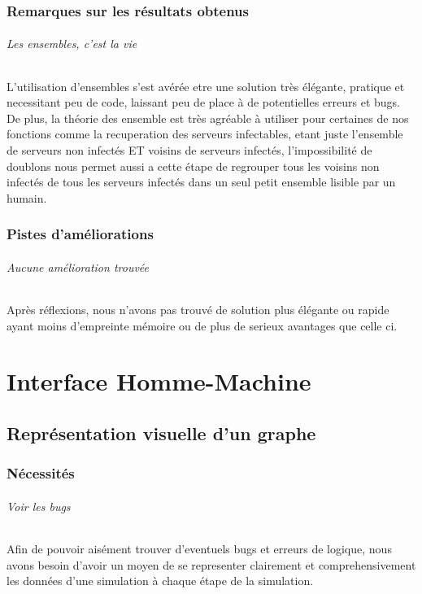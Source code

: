 \documentclass{scrreprt}
\begin{document}
    \section{Remarques sur les résultats obtenus}

    \paragraph{Les ensembles, c'est la vie}
    L'utilisation d'ensembles s'est avérée etre une solution très élégante,
    pratique et necessitant peu de code, laissant peu de place à de
    potentielles erreurs et bugs.
    De plus, la théorie des ensemble est très agréable à utiliser pour
    certaines de nos fonctions comme la recuperation des serveurs
    infectables, etant juste l'ensemble de serveurs non infectés ET voisins
    de serveurs infectés, l'impossibilité de doublons nous permet aussi a
    cette étape de regrouper tous les voisins non infectés de tous les serveurs
    infectés dans un seul petit ensemble lisible par un humain.

    \section{Pistes d'améliorations}

    \paragraph{Aucune amélioration trouvée}
    Après réflexions, nous n'avons pas trouvé de solution plus élégante ou
    rapide ayant moins d'empreinte mémoire ou de plus de serieux avantages que
    celle ci.


    \part{Interface Homme-Machine}
    \chapter{Représentation visuelle d'un graphe}
    \section{Nécessités}

    \paragraph{Voir les bugs}
    Afin de pouvoir aisément trouver d'eventuels bugs et erreurs de logique,
    nous avons besoin d'avoir un moyen de se representer clairement et
    comprehensivement les données d'une simulation à chaque étape de la
    simulation.
\end{document}
